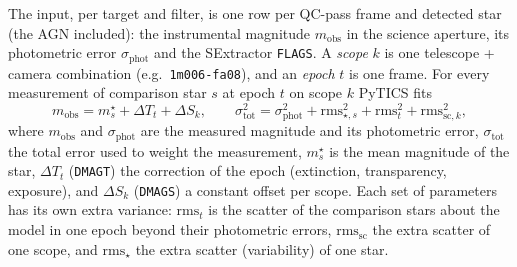\documentclass[10pt,a4paper,oneside]{report}
\renewcommand{\_}{\oldunderscore\allowbreak}
\begin{document}
The input, per target and filter, is one row per QC-pass frame and detected star (the AGN included):
the instrumental magnitude $m_\mathrm{obs}$ in the science aperture, its photometric error
$\sigma_\mathrm{phot}$ and the SExtractor \texttt{FLAGS}. A \emph{scope} $k$ is one
telescope + camera combination (e.g.\ \texttt{1m006-fa08}), and an \emph{epoch} $t$ is one frame.
For every measurement of comparison star $s$ at epoch $t$ on scope $k$ PyTICS fits
\begin{equation}
  m_\mathrm{obs} = m^\star_s + \Delta T_t + \Delta S_k ,
  \qquad
  \sigma_\mathrm{tot}^2 = \sigma_\mathrm{phot}^2 + \mathrm{rms}_{\star,s}^2 + \mathrm{rms}_t^2 + \mathrm{rms}_{\mathrm{sc},k}^2 ,
  \label{eq:pytics}
\end{equation}
where $m_\mathrm{obs}$ and $\sigma_\mathrm{phot}$ are the measured magnitude and its photometric
error, $\sigma_\mathrm{tot}$ the total error used to weight the measurement,
$m^\star_s$ is the mean magnitude of the star, $\Delta T_t$ (\texttt{DMAGT}) the
correction of the epoch (extinction, transparency, exposure), and $\Delta S_k$ (\texttt{DMAGS}) a
constant offset per scope. Each set of parameters has its own extra variance: $\mathrm{rms}_t$ is the
scatter of the comparison stars about the model in one epoch beyond their photometric errors,
$\mathrm{rms}_\mathrm{sc}$ the extra scatter of one scope, and $\mathrm{rms}_\star$ the extra scatter
(variability) of one star.
\end{document}
